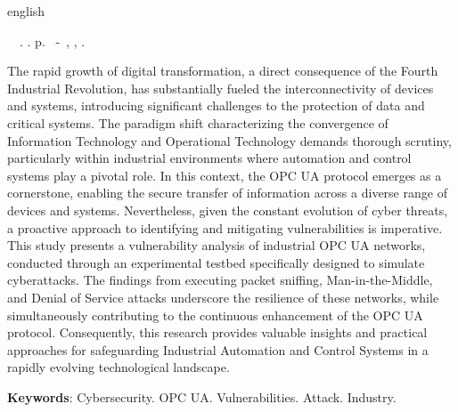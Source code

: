 \begin{resumo}[Abstract]
 \begin{otherlanguage*}{english}
	\begin{flushleft} 
		\setlength{\absparsep}{0pt} %
 		\SingleSpacing  		\imprimirautorabr~~\textbf{\imprimirtitleabstract}.	\imprimirdata.  \pageref{LastPage}p. 
		\imprimirtipotrabalhoabs~-~\imprimirinstituicao, \imprimirlocal, 	\imprimirdata. 
 	\end{flushleft}
	\OnehalfSpacing 
   The rapid growth of digital transformation, a direct consequence of the Fourth Industrial Revolution, has substantially fueled the interconnectivity of devices and systems, introducing significant challenges to the protection of data and critical systems. The paradigm shift characterizing the convergence of Information Technology and Operational Technology demands thorough scrutiny, particularly within industrial environments where automation and control systems play a pivotal role. In this context, the OPC UA protocol emerges as a cornerstone, enabling the secure transfer of information across a diverse range of devices and systems. Nevertheless, given the constant evolution of cyber threats, a proactive approach to identifying and mitigating vulnerabilities is imperative. This study presents a vulnerability analysis of industrial OPC UA networks, conducted through an experimental testbed specifically designed to simulate cyberattacks. The findings from executing packet sniffing, Man-in-the-Middle, and Denial of Service attacks underscore the resilience of these networks, while simultaneously contributing to the continuous enhancement of the OPC UA protocol. Consequently, this research provides valuable insights and practical approaches for safeguarding Industrial Automation and Control Systems in a rapidly evolving technological landscape.

   \vspace{\onelineskip}
 
   \noindent 
   \textbf{Keywords}: Cybersecurity. OPC UA. Vulnerabilities. Attack. Industry.
 \end{otherlanguage*}
\end{resumo}
